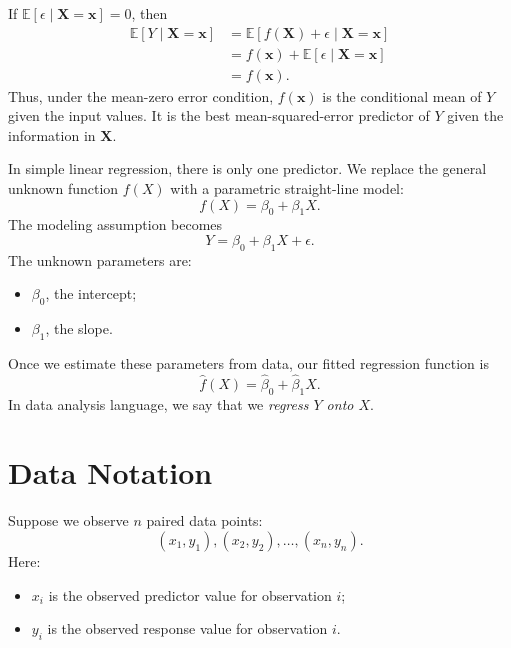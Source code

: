 If $\mathbb{E}[\epsilon \mid \mathbf{X}=\mathbf{x}]=0$, then
\begin{align}
  \mathbb{E}[Y\mid \mathbf{X}=\mathbf{x}]
  &=\mathbb{E}[f(\mathbf{X})+\epsilon\mid \mathbf{X}=\mathbf{x}] \\
  &= f(\mathbf{x})+\mathbb{E}[\epsilon\mid \mathbf{X}=\mathbf{x}] \\
  &= f(\mathbf{x}).
\end{align}
Thus, under the mean-zero error condition, $f(\mathbf{x})$ is the conditional mean of $Y$ given the input values.  It is the best mean-squared-error predictor of $Y$ given the information in $\mathbf{X}$.

In simple linear regression, there is only one predictor.  We replace the general unknown function $f(X)$ with a parametric straight-line model:
\begin{equation}
  f(X)=\beta_0+\beta_1X.
\end{equation}
The modeling assumption becomes
\begin{equation}
  Y=\beta_0+\beta_1X+\epsilon.
  \label{eq:ch5-slr-population-model}
\end{equation}
The unknown parameters are:
\begin{itemize}
  \item $\beta_0$, the intercept;
  \item $\beta_1$, the slope.
\end{itemize}

Once we estimate these parameters from data, our fitted regression function is
\begin{equation}
  \widehat{f}(X)=\widehat{\beta}_0+\widehat{\beta}_1X.
\end{equation}
In data analysis language, we say that we \emph{regress $Y$ onto $X$}.

\section{Data Notation}

Suppose we observe $n$ paired data points:
\begin{equation}
  (x_1,y_1),(x_2,y_2),\ldots,(x_n,y_n).
\end{equation}
Here:
\begin{itemize}
  \item $x_i$ is the observed predictor value for observation $i$;
  \item $y_i$ is the observed response value for observation $i$.
\end{itemize}

